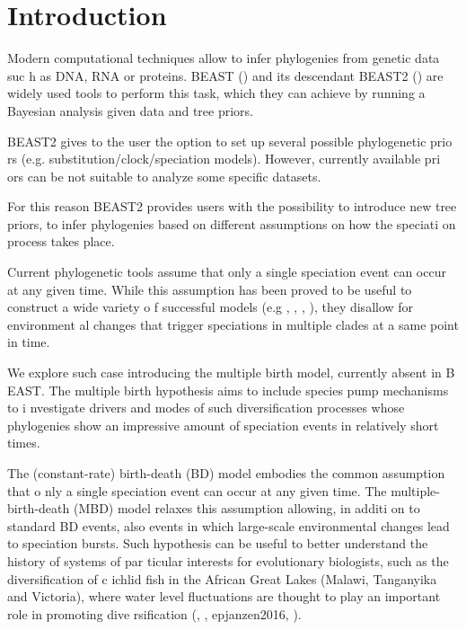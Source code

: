\section{Introduction}

Modern computational techniques allow to infer phylogenies from genetic data suc
h as DNA, RNA or proteins. BEAST (\cite{beast}) and its descendant BEAST2 (\cite
{beast2}) are widely used tools to perform this task, which they can achieve by 
running a Bayesian analysis given data and tree priors.

BEAST2 gives to the user the option to set up several possible phylogenetic prio
rs (e.g. substitution/clock/speciation models). However, currently available pri
ors can be not suitable to analyze some specific datasets.

For this reason BEAST2 provides users with the possibility to introduce new tree
 priors, to infer phylogenies based on different assumptions on how the speciati
on process takes place.

Current phylogenetic tools assume that only a single speciation event can occur 
at any given time.
While this assumption has been proved to be useful to construct a wide variety o
f successful models (e.g \cite{Maddison2007biSSE}, \cite{Valente2015}, \cite{eti
enne2012diversity}, \cite{etienne2014estimating}), they disallow for environment
al changes that trigger speciations in multiple clades at a same point in time. 

We explore such case introducing the multiple birth model, currently absent in B
EAST. The multiple birth hypothesis aims to include species pump mechanisms to i
nvestigate drivers and modes of such diversification processes whose phylogenies
 show an impressive amount of speciation events in relatively short times.

The (constant-rate) birth-death (BD) model embodies the common assumption that o
nly a single speciation event can occur at any given time.
The multiple-birth-death (MBD) model relaxes this assumption allowing, in additi
on to standard BD events, also events in which large-scale environmental changes
 lead to speciation bursts.
Such hypothesis can be useful to better understand the history of systems of par
ticular interests for evolutionary biologists, such as the  diversification of c
ichlid fish in the African Great Lakes (Malawi, Tanganyika and Victoria), where 
water level fluctuations are thought to play an important role in promoting dive
rsification (\citep{verheyen1996mitochondrial}, \citep{sturmbauer2001lake}, \cit
ep{janzen2016}, \citep{janzen2017}).

